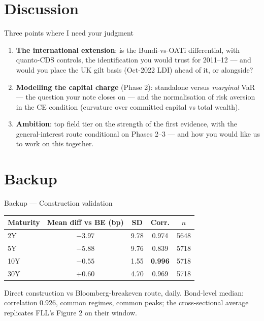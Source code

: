 \documentclass[aspectratio=169]{beamer}
\begin{document}
\section{Discussion}
\begin{frame}{Three points where I need your judgment}
\begin{enumerate}\setlength\itemsep{0.8em}
  \item \textbf{The international extension}: is the Bund\texteuro i-vs-OAT\texteuro i
        differential, with quanto-CDS controls, the identification you would trust for
        2011--12 --- and would you place the UK gilt basis (Oct-2022 LDI) ahead of it,
        or alongside?
  \item \textbf{Modelling the capital charge} (Phase 2): standalone versus \emph{marginal}
        VaR --- the question your note closes on --- and the normalisation of risk aversion
        in the CE condition (curvature over committed capital vs total wealth).
  \item \textbf{Ambition}: top field tier on the strength of the first evidence, with the
        general-interest route conditional on Phases 2--3 --- and how you would like us to
        work on this together.
\end{enumerate}
\end{frame}

\appendix
\section*{Backup}
\begin{frame}{Backup --- Construction validation}
\begin{center}\small
\begin{tabular}{lcccc}
\toprule
Maturity & Mean diff vs BE (bp) & SD & Corr. & $n$ \\
\midrule
2Y & $-3.97$ & 9.78 & 0.974 & 5648 \\
5Y & $-5.88$ & 9.76 & 0.839 & 5718 \\
10Y & $-0.55$ & 1.55 & \textbf{0.996} & 5718 \\
30Y & $+0.60$ & 4.70 & 0.969 & 5718 \\
\bottomrule
\end{tabular}
\end{center}
{\small Direct construction vs Bloomberg-breakeven route, daily. Bond-level median:
correlation 0.926, common regimes, common peaks; the cross-sectional average replicates
FLL's Figure 2 on their window.}
\end{frame}
\end{document}
